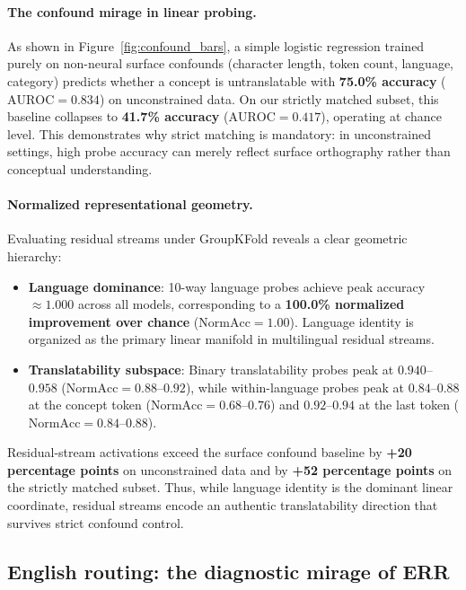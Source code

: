 \documentclass{article}
\begin{document}
\paragraph{The confound mirage in linear probing.}
As shown in Figure~\ref{fig:confound_bars}, a simple logistic regression trained purely on non-neural surface confounds (character length, token count, language, category) predicts whether a concept is untranslatable with \textbf{75.0\% accuracy} ($\text{AUROC} = 0.834$) on unconstrained data. On our strictly matched subset, this baseline collapses to \textbf{41.7\% accuracy} ($\text{AUROC} = 0.417$), operating at chance level. This demonstrates why strict matching is mandatory: in unconstrained settings, high probe accuracy can merely reflect surface orthography rather than conceptual understanding.

\paragraph{Normalized representational geometry.}
Evaluating residual streams under GroupKFold reveals a clear geometric hierarchy:
\begin{itemize}
    \item \textbf{Language dominance}: 10-way language probes achieve peak accuracy $\approx 1.000$ across all models, corresponding to a \textbf{100.0\% normalized improvement over chance} ($\text{NormAcc} = 1.00$). Language identity is organized as the primary linear manifold in multilingual residual streams.
    \item \textbf{Translatability subspace}: Binary translatability probes peak at $0.940$--$0.958$ ($\text{NormAcc} = 0.88$--$0.92$), while within-language probes peak at $0.84$--$0.88$ at the concept token ($\text{NormAcc} = 0.68$--$0.76$) and $0.92$--$0.94$ at the last token ($\text{NormAcc} = 0.84$--$0.88$).
\end{itemize}
Residual-stream activations exceed the surface confound baseline by \textbf{+20 percentage points} on unconstrained data and by \textbf{+52 percentage points} on the strictly matched subset. Thus, while language identity is the dominant linear coordinate, residual streams encode an authentic translatability direction that survives strict confound control.

\subsection{English routing: the diagnostic mirage of ERR}
\end{document}
